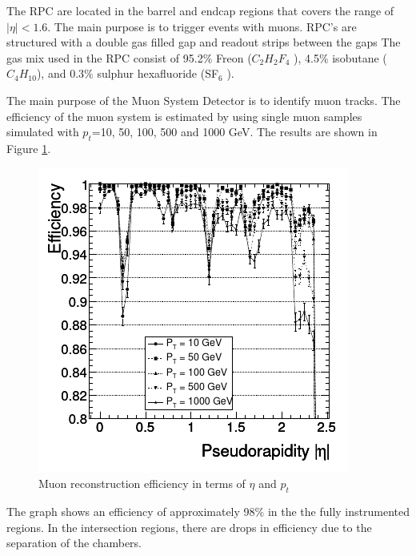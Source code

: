 The RPC are located in the barrel and endcap regions that covers the range of $|\eta|<1.6$. The main purpose is to trigger events with muons. 
RPC's are structured with a double gas filled gap and readout strips between the gaps
 The gas mix used in the RPC consist of 95.2$\%$ Freon
($C_2 H_2 F_4$ ), 4.5$\%$ isobutane ($C_4 H_{10}$), and 0.3$\%$ sulphur hexafluoride (SF$_6$ )\cite{cms7}.



The main purpose of the Muon System Detector is to identify muon tracks. 
The efficiency of the muon system is estimated by using single muon samples simulated with $p_t$=10, 50, 100, 500 and 1000 GeV. The results are shown in Figure \ref{mu-efi}.
\begin{figure}
	\centering
	\includegraphics[width=0.6\linewidth]{Chapter2/mu-efi}
	\caption[Muon reconstruction efficiency in terms of $\eta$ and $p_t$]{Muon reconstruction efficiency in terms of $\eta$ and $p_t$\cite{cms-manual}}
	\label{mu-efi}
\end{figure}
The graph shows an efficiency of approximately 98$\%$ in the the fully instrumented regions. In the intersection regions, there are drops in efficiency due to the separation of the chambers. %

